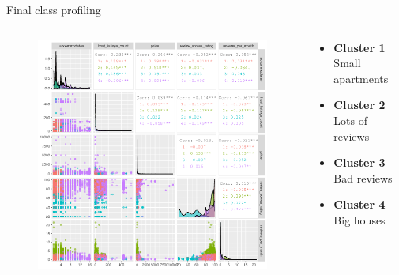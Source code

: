 \begin{frame}{Final class profiling}
\begin{columns}
\begin{column}{0.5\textwidth}
\begin{figure}[H]
\centering
\includegraphics[width=\textwidth]{pairs.png}
\end{figure}
\end{column}
\begin{column}{0.5\textwidth}
    \begin{itemize}
        \item \textcolor{vermell}{\textbf{Cluster 1}} Small apartments
        \item \textcolor{verd}{\textbf{Cluster 2}} Lots of reviews
        \item \textcolor{blau}{\textbf{Cluster 3}} Bad reviews
        \item \textcolor{lila}{\textbf{Cluster 4}} Big houses
    \end{itemize}
\end{column}
\end{columns}
\end{frame}



